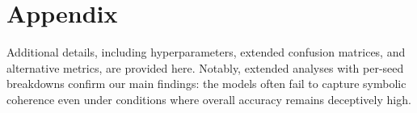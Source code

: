 \documentclass{article}
\begin{document}
\clearpage
\appendix
\section{Appendix}
Additional details, including hyperparameters, extended confusion matrices, and alternative metrics, are provided here. Notably, extended analyses with per-seed breakdowns confirm our main findings: the models often fail to capture symbolic coherence even under conditions where overall accuracy remains deceptively high.



\end{document}
